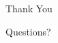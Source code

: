 \documentclass[aspectratio=169,11pt]{beamer}
\begin{document}

\begin{frame}{Thank You}

  \begin{center}

    \large Questions?

  \end{center}

\end{frame}
\end{document}
